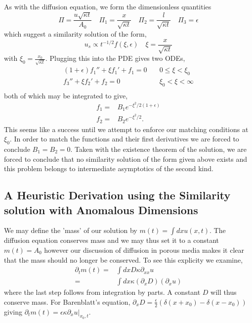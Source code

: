 As with the diffusion equation, we form the dimensionless quantities
\[\Pi = \frac{u \sqrt{\kappa t}}{A_0}\quad \Pi_1 = \frac{x}{\sqrt{\kappa t}} \quad
\Pi_2 = \frac{l}{\sqrt{\kappa t}}\quad \Pi_3 = \epsilon\]
which suggest a similarity solution of the form,
\[u_s \propto t^{-1/2} f(\xi,\epsilon) \quad \xi = \frac{x}{\sqrt{\kappa t}}\]
with $\xi_0 = \frac{x_0}{\sqrt{\kappa t}}$.  Plugging this into the PDE gives two
ODEs,
\begin{align*}
(1+\epsilon)f_1'' + \xi f_1' + f_1 = 0& \quad 0 \le \xi < \xi_0 \\
f_3'' + \xi f_2' + f_2 = 0& \quad  \xi_0< \xi < \infty \\
\end{align*}
both of which may be integrated to give,
\begin{align*}
f_1 =& B_1 e^{-\xi^2 / 2(1+\epsilon)} \\
f_2 =& B_2 e^{-\xi^2 / 2}.
\end{align*}
This seems like a success until we attempt to enforce our matching conditions at $\xi_0$.  In
order to match the functions and their first derivatives we are forced to conclude
$B_1 = B_2 = 0$.  Taken with the existence theorem of the solution, we are forced to conclude
that no similarity solution of the form given above exists and this problem belongs to
intermediate asymptotics of the second kind.

\subsection{A Heuristic Derivation using the Similarity solution with Anomalous Dimensions}

We may define the 'mass' of our solution by $m(t) = \int dx u(x, t)$.  The diffusion equation
conserves mass and we may thus set it to a constant $m(t) = A_0$ however our discussion
of diffusion in porous media makes it clear that the mass should no longer be conserved.
To see this explicity we examine,
\begin{align*}
\partial_t m(t) =& \int dx D\kappa \partial_{xx} u \\
=& \int dx \kappa (\partial_x D) (\partial_x u)
\end{align*}
where the last step follows from integration by parts.  A constant $D$ will thus conserve mass.
For Barenblatt's equation, $\partial_x D = \frac{\epsilon}{2}(\delta(x + x_0) - \delta(x - x_0))$
giving $\partial_t m(t) = \epsilon\kappa\left.\partial_x u\right|_{x_0, t}$.


